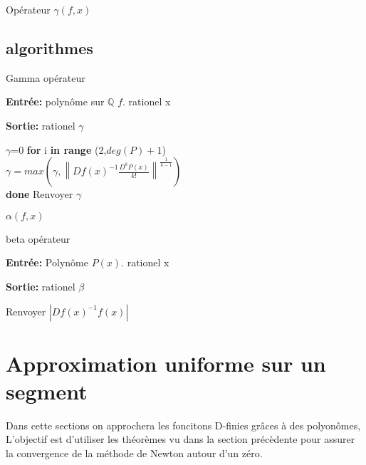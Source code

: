 \documentclass[a4paper,11pt]{article}
\begin{document}
\noindent Opérateur $\gamma(f,x)$

\subsection{algorithmes}

\begin{algorithm}
	\caption{Gamma opérateur}
	
	\vspace{2mm}
	
	\textbf{Entrée:} polynôme sur $\mathbb{Q}$ $f$. rationel x
	
	\textbf{Sortie:} rationel $\gamma$
	
	\begin{algorithmic}[1]
		
		\STATE $\gamma$=0
		\STATE \textbf{for} i \textbf{in range} (2,$deg(P)+1$)\\
		\hspace{3mm} $\gamma=max(\gamma,\left\|Df(x)^{-1}\frac{D^{k}P(x)}{k!}\right\|^{\frac{1}{k-1}})$\\
		\textbf{done}
		\STATE Renvoyer $\gamma$
		
	\end{algorithmic}
	
\end{algorithm}


\noindent $\alpha(f,x)$
\begin{algorithm}
	\caption{beta opérateur}
	
	\vspace{2mm}
	
	\textbf{Entrée:} Polynôme $P(x)$. rationel x
	
	\textbf{Sortie:} rationel $\beta$
	
	\begin{algorithmic}[1]
		
		\STATE Renvoyer $|Df(x)^{-1}f(x)|$
			
		\end{algorithmic}
		
	\end{algorithm}


\section{Approximation uniforme sur un segment}

Dans cette sections on approchera les foncitons D-finies grâces à des polyonômes, L'objectif est d'utiliser les théorèmes vu dans la section précèdente pour assurer la convergence de la méthode de Newton autour d'un zéro. 
\end{document}
